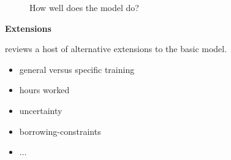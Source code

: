 \begin{frame}\begin{figure}[htp]\centering

How well does the model do?

\end{figure}\end{frame}
\begin{frame}\textbf{Extensions}\vspace{0.3cm}

 reviews a host of alternative extensions to the basic model.\\

\begin{itemize}\setlength\itemsep{1em}
\item general versus specific training
\item hours worked
\item uncertainty
\item borrowing-constraints
\item $\hdots$
\end{itemize}

\end{frame}
